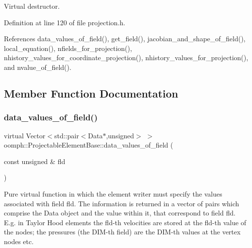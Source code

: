 Virtual destructor. 



Definition at line 120 of file projection.\+h.



References data\+\_\+values\+\_\+of\+\_\+field(), get\+\_\+field(), jacobian\+\_\+and\+\_\+shape\+\_\+of\+\_\+field(), local\+\_\+equation(), nfields\+\_\+for\+\_\+projection(), nhistory\+\_\+values\+\_\+for\+\_\+coordinate\+\_\+projection(), nhistory\+\_\+values\+\_\+for\+\_\+projection(), and nvalue\+\_\+of\+\_\+field().



\subsection{Member Function Documentation}
\mbox{\label{classoomph_1_1ProjectableElementBase_a644306ebdf16f334344c2d27d72f18b7}} 
\subsubsection{\texorpdfstring{data\+\_\+values\+\_\+of\+\_\+field()}{data\_values\_of\_field()}}
{\footnotesize\ttfamily virtual Vector$<$std\+::pair$<$Data$\ast$,unsigned$>$ $>$ oomph\+::\+Projectable\+Element\+Base\+::data\+\_\+values\+\_\+of\+\_\+field (\begin{DoxyParamCaption}\item[{const unsigned \&}]{fld }\end{DoxyParamCaption})\hspace{0.3cm}{\ttfamily [pure virtual]}}



Pure virtual function in which the element writer must specify the values associated with field fld. The information is returned in a vector of pairs which comprise the Data object and the value within it, that correspond to field fld. E.\+g. in Taylor Hood elements the fld-\/th velocities are stored at the fld-\/th value of the nodes; the pressures (the D\+I\+M-\/th field) are the D\+I\+M-\/th values at the vertex nodes etc. 



